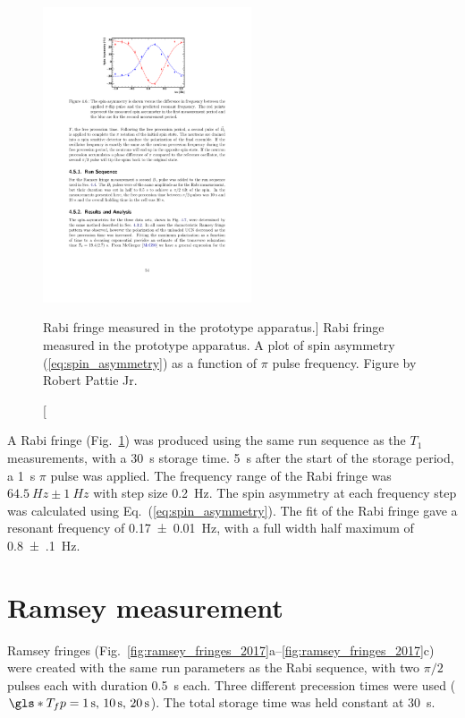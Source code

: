 \begin{figure}
    \centering
    \includegraphics[width=0.55\textwidth]{figures/2017_rabi_fringe.pdf}
    \caption
    [Rabi fringe measured in the prototype apparatus.]
    {Rabi fringe measured in the prototype apparatus. A plot of spin asymmetry (\ref{eq:spin_asymmetry}) as a function of $\pi$ pulse frequency. Figure by Robert Pattie Jr.}
    \label{fig:rabi_fringe_2017}
\end{figure}

A Rabi fringe (Fig.~\ref{fig:rabi_fringe_2017}) was produced using the same run sequence as the $T_1$ measurements, with a \qty{30}{\second} storage time. \qty{5}{\second} after the start of the storage period, a \qty{1}{\second} $\pi$ pulse was applied. The frequency range of the Rabi fringe was $\qty{64.5}{Hz} \pm \qty{1}{Hz}$ with step size \qty{0.2}{Hz}. The spin asymmetry at each frequency step was calculated using Eq.~(\ref{eq:spin_asymmetry}). The fit of the Rabi fringe gave a resonant frequency of \qty{0.17(1)}{Hz}, with a full width half maximum of \qty{0.8(1)}{Hz}.


\section{Ramsey measurement}\label{sec:2017_ramsey_measurement}


Ramsey fringes (Fig.~\ref{fig:ramsey_fringes_2017}a--\ref{fig:ramsey_fringes_2017}c) were created with the same run parameters as the Rabi sequence, with two $\pi/2$ pulses each with duration \qty{0.5}{s} each. Three different precession times were used ($\gls*{T_fp}=\qty{1}{s},\,\qty{10}{s},\,\qty{20}{s}$). The total storage time was held constant at \qty{30}{\second}.

